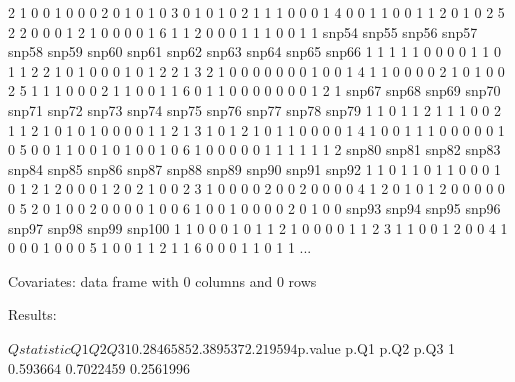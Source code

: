 \documentclass{article}
\begin{document}
\begin{Schunk}
\begin{Soutput}
2     1     0     0     1     0     0     0     2     0     1     0     1     0
3     0     1     0     1     0     2     1     1     1     0     0     0     1
4     0     0     1     1     0     0     1     1     2     0     1     0     2
5     2     2     0     0     0     1     2     1     0     0     0     0     1
6     1     1     2     0     0     0     1     1     1     0     0     1     1
  snp54 snp55 snp56 snp57 snp58 snp59 snp60 snp61 snp62 snp63 snp64 snp65 snp66
1     1     1     1     1     0     0     0     0     1     1     0     1     1
2     2     1     0     1     0     0     0     1     0     1     2     2     1
3     2     1     0     0     0     0     0     0     0     1     0     0     1
4     1     1     0     0     0     0     2     1     0     1     0     0     2
5     1     1     1     0     0     0     2     1     1     0     0     1     1
6     0     1     1     0     0     0     0     0     0     0     1     2     1
  snp67 snp68 snp69 snp70 snp71 snp72 snp73 snp74 snp75 snp76 snp77 snp78 snp79
1     1     0     1     1     2     1     1     1     0     0     2     1     1
2     1     0     1     0     1     0     0     0     0     1     1     2     1
3     1     0     1     2     1     0     1     1     0     0     0     0     1
4     1     0     0     1     1     1     0     0     0     0     0     1     0
5     0     0     1     1     0     0     1     0     1     0     0     1     0
6     1     0     0     0     0     0     1     1     1     1     1     1     2
  snp80 snp81 snp82 snp83 snp84 snp85 snp86 snp87 snp88 snp89 snp90 snp91 snp92
1     1     0     1     1     0     1     1     0     0     0     1     0     1
2     1     2     0     0     0     1     2     0     2     1     0     0     2
3     1     0     0     0     0     2     0     0     2     0     0     0     0
4     1     2     0     1     0     1     2     0     0     0     0     0     0
5     2     0     1     0     0     2     0     0     0     0     1     0     0
6     1     0     0     1     0     0     0     0     2     0     1     0     0
  snp93 snp94 snp95 snp96 snp97 snp98 snp99 snp100
1     1     0     0     0     1     0     1      1
2     1     0     0     0     0     1     1      2
3     1     1     0     0     1     2     0      0
4     1     0     0     0     1     0     0      0
5     1     0     0     1     1     2     1      1
6     0     0     0     1     1     0     1      1
...

Covariates:
data frame with 0 columns and 0 rows


Results:

$Qstatistic
         Q1       Q2       Q3
1 0.2846585 2.389537 2.219594

$p.value
      p.Q1      p.Q2      p.Q3
1 0.593664 0.7022459 0.2561996
\end{Soutput}
\end{Schunk}
\end{document}
